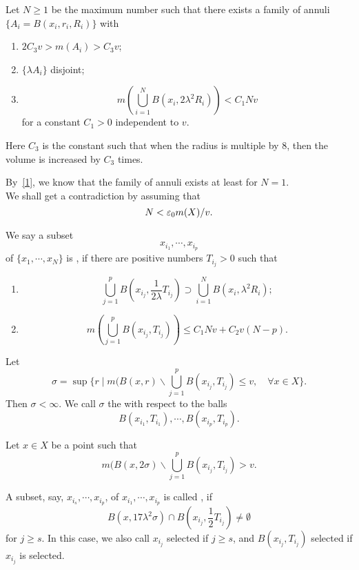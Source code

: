 Let $N\geq 1$ be the maximum number such that 
there exists a family of annuli $\{A_i=B(x_i, r_i, R_i)\}$ with
\begin{enumerate}
\item $2C_3v>m(A_i)>C_3v$;
\item $\{\lambda A_i\}$ disjoint;
\item
\[
m(\bigcup_{i=1}^NB(x_i, 2\lambda^2 R_i))<C_1Nv
\]
for a constant $C_1>0$ independent to $v$. 
\end{enumerate}
Here $C_3$ is the constant such that when the radius is multiple by $8$, then the volume is increased by $C_3$ times. 
\vspace{.3in}

By~\eqref{1}, we know that the family of annuli exists at least for $N=1$.\\

We shall get a contradiction by 
assuming that
\begin{equation}\label{0-0}
N<\varepsilon_0 m(X)/v.
\end{equation}



\begin{definition}
 We say a subset 
\[
x_{i_1},\cdots, x_{i_p}
\]
of $\{x_1,\cdots, x_N\}$ is \emph{}, if there are positive numbers $T_{i_j}>0$ such that 
\begin{enumerate}
\item 
\[
\bigcup_{j=1}^{p} B(x_{i_j}, \frac{1}{2\lambda}T_{i_j})\supset \bigcup_{i=1}^{N} B(x_i,   \lambda^2R_i);
\]
\item
\[
m(\bigcup_{j=1}^{p} B(x_{i_j}, T_{i_j}))\leq C_1Nv+C_2v(N-p).
\]
\end{enumerate}
\end{definition}

\begin{definition}
Let
\[
\sigma=\sup \{r\mid m(B(x,r)\backslash \bigcup_{j=1} ^p B(x_{i_j}, T_{i_j})\leq v,\quad  \forall x\in X \}.
\]
Then $\sigma<\infty$. 
We call $\sigma$ the \emph{} with respect to the balls 
\[
B(x_{i_1}, T_{i_1}),\cdots, B(x_{i_p}, T_{i_p}).
\]
\end{definition}

Let $x\in X$ be a point such that 
\[
m(B(x,2\sigma)\backslash \bigcup_{j=1} ^p B(x_{i_j}, T_{i_j})>v.
\]

\begin{definition}
A subset, say,  $x_{i_s},\cdots, x_{i_p}$, of $x_{i_1},\cdots, x_{i_p}$ is called  \emph{}, if
\[
B(x,17\lambda^2 \sigma)\cap B(x_{i_j}, \frac 12 T_{i_j})\neq\emptyset
\]
for $j\geq s$. In this case, we also call $x_{i_j}$  selected if $j\geq s$, and  $B(x_{i_j}, T_{i_j})$ selected if $x_{i_j}$ is selected. 
\end{definition}


